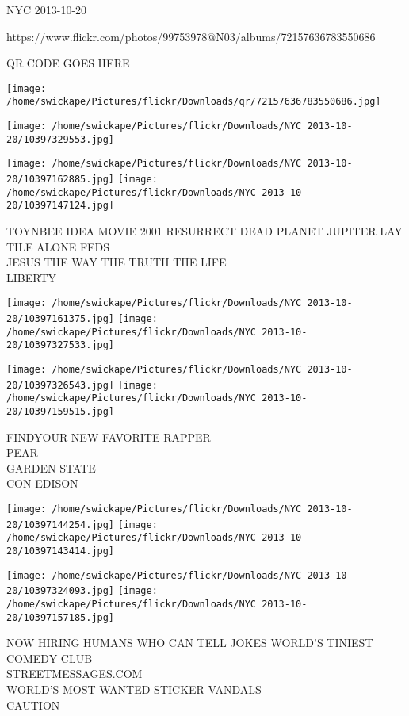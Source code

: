 \documentclass[10pt,letterpaper]{article}
\begin{document}
NYC 2013-10-20

https://www.flickr.com/photos/99753978@N03/albums/72157636783550686

QR CODE GOES HERE

\texttt{[image: /home/swickape/Pictures/flickr/Downloads/qr/72157636783550686.jpg]}
\pagebreak

\texttt{[image: /home/swickape/Pictures/flickr/Downloads/NYC 2013-10-20/10397329553.jpg]}

\vspace{0.25in}
\texttt{[image: /home/swickape/Pictures/flickr/Downloads/NYC 2013-10-20/10397162885.jpg]}
\texttt{[image: /home/swickape/Pictures/flickr/Downloads/NYC 2013-10-20/10397147124.jpg]}

TOYNBEE IDEA MOVIE 2001 RESURRECT DEAD PLANET JUPITER LAY TILE ALONE FEDS\\
JESUS THE WAY THE TRUTH THE LIFE\\
LIBERTY\\
\pagebreak

\texttt{[image: /home/swickape/Pictures/flickr/Downloads/NYC 2013-10-20/10397161375.jpg]}
\texttt{[image: /home/swickape/Pictures/flickr/Downloads/NYC 2013-10-20/10397327533.jpg]}

\texttt{[image: /home/swickape/Pictures/flickr/Downloads/NYC 2013-10-20/10397326543.jpg]}
\texttt{[image: /home/swickape/Pictures/flickr/Downloads/NYC 2013-10-20/10397159515.jpg]}

FINDYOUR NEW FAVORITE RAPPER\\
PEAR\\
GARDEN STATE\\
CON EDISON\\
\pagebreak

\texttt{[image: /home/swickape/Pictures/flickr/Downloads/NYC 2013-10-20/10397144254.jpg]}
\texttt{[image: /home/swickape/Pictures/flickr/Downloads/NYC 2013-10-20/10397143414.jpg]}

\texttt{[image: /home/swickape/Pictures/flickr/Downloads/NYC 2013-10-20/10397324093.jpg]}
\texttt{[image: /home/swickape/Pictures/flickr/Downloads/NYC 2013-10-20/10397157185.jpg]}

NOW HIRING HUMANS WHO CAN TELL JOKES WORLD'S TINIEST COMEDY CLUB\\
STREETMESSAGES.COM\\
WORLD'S MOST WANTED STICKER VANDALS\\
CAUTION\\
\pagebreak
\end{document}
